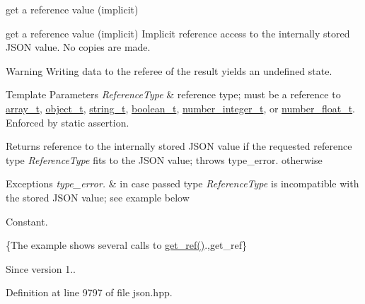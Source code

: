 get a reference value (implicit) 

get a reference value (implicit) Implicit reference access to the internally stored J\+S\+ON value. No copies are made.

\begin{DoxyWarning}{Warning}
Writing data to the referee of the result yields an undefined state.
\end{DoxyWarning}

\begin{DoxyTemplParams}{Template Parameters}
{\em Reference\+Type} & reference type; must be a reference to \hyperlink{classnlohmann_1_1basic__json_a4c409f1b6d9caf3412c78af9a5883fed}{array\+\_\+t}, \hyperlink{classnlohmann_1_1basic__json_a3cdea044cc3ecba1c4f9874a89daf6e4}{object\+\_\+t}, \hyperlink{classnlohmann_1_1basic__json_a61f8566a1a85a424c7266fb531dca005}{string\+\_\+t}, \hyperlink{classnlohmann_1_1basic__json_a4c919102a9b4fe0d588af64801436082}{boolean\+\_\+t}, \hyperlink{classnlohmann_1_1basic__json_a98e611d67b7bd75307de99c9358ab2dc}{number\+\_\+integer\+\_\+t}, or \hyperlink{classnlohmann_1_1basic__json_a88d6103cb3620410b35200ee8e313d97}{number\+\_\+float\+\_\+t}. Enforced by static assertion.\\
\hline
\end{DoxyTemplParams}
\begin{DoxyReturn}{Returns}
reference to the internally stored J\+S\+ON value if the requested reference type {\itshape Reference\+Type} fits to the J\+S\+ON value; throws type\+\_\+error. otherwise
\end{DoxyReturn}

\begin{DoxyExceptions}{Exceptions}
{\em type\+\_\+error.} & in case passed type {\itshape Reference\+Type} is incompatible with the stored J\+S\+ON value; see example below\\
\hline
\end{DoxyExceptions}
Constant.

\{The example shows several calls to {\ttfamily \hyperlink{classnlohmann_1_1basic__json_afbd800010b67619463c0fce6e74f7878}{get\+\_\+ref()}}.,get\+\_\+ref\}

\begin{DoxySince}{Since}
version 1.. 
\end{DoxySince}


Definition at line 9797 of file json.\+hpp.

